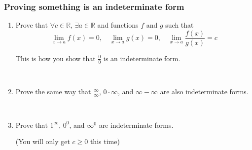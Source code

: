 \documentclass[14pt]{beamer}
\begin{document}
	\begin{frame}[t]
		\fontsize{13}{13}\selectfont
		\frametitle{Proving something is an indeterminate form}

		\begin{enumerate}
			\item Prove that $\displaystyle \forall c \in \mathbb{R}$,
				$\displaystyle \exists a \in \mathbb{R}$ and functions $f$ and $g$ such
				that
				\[
					\lim_{x \to a}f(x) = 0, \quad \lim_{x \to a}g(x) =0, \quad \lim_{x \to
					a}\frac{f(x)}{g(x)}= c
				\]

				This is how you show that $\displaystyle \frac{0}{0}$ is an indeterminate
				form.

				\

			\item Prove the same way that $\displaystyle \frac{\infty}{\infty}$,
				$\displaystyle 0 \cdot \infty$, and $\displaystyle \infty - \infty$ are also
				indeterminate forms.

				\

			\item Prove that $\displaystyle 1^{\infty}$, $\displaystyle 0^{0}$, and $\displaystyle
				\infty^{0}$ are indeterminate forms.

				(You will only get $c \geq 0$ this time)
		\end{enumerate}
	\end{frame}




\end{document}
